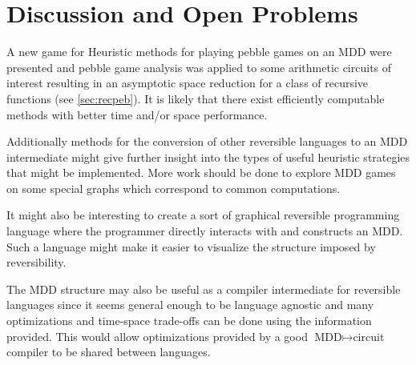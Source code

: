 \chapter{Discussion and Open Problems}

A new game for Heuristic methods for playing pebble games on an MDD were
presented and pebble game analysis was applied to some arithmetic circuits of
interest resulting in an asymptotic space reduction for a class of recursive
functions (see \ref{sec:recpeb}). It is likely that there exist efficiently
computable methods with better time and/or space performance. 

Additionally methods for the conversion of other reversible languages to an MDD
intermediate might give further insight into the types of useful heuristic
strategies that might be implemented. More work should be done to explore MDD
games on some special graphs which correspond to common computations.

It might also be interesting to create a sort of graphical reversible
programming language where the programmer directly interacts with and
constructs an MDD. Such a language might make it easier to visualize the
structure imposed by reversibility. 

The MDD structure may also be useful as a compiler intermediate for reversible
languages since it seems general enough to be language agnostic and many
optimizations and time-space trade-offs can be done using the information
provided. This would allow optimizations provided by a good
$\text{MDD}\mapsto\text{circuit}$ compiler to be shared between languages. 
